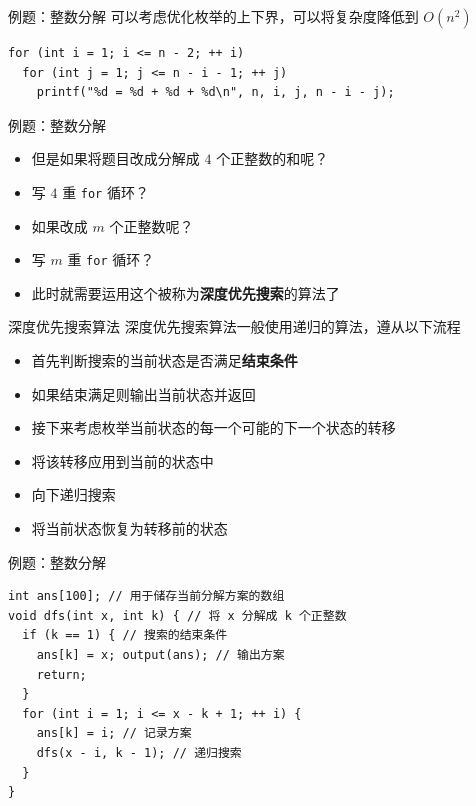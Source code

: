 \documentclass[12pt,aspectratio=169]{beamer}
\begin{document}
\begin{frame}[fragile]{例题：整数分解}
  可以考虑优化枚举的上下界，可以将复杂度降低到 $O(n^2)$
  \begin{verbatim}
for (int i = 1; i <= n - 2; ++ i)
  for (int j = 1; j <= n - i - 1; ++ j)
    printf("%d = %d + %d + %d\n", n, i, j, n - i - j);
  \end{verbatim}
\end{frame}

\begin{frame}[fragile]{例题：整数分解}
  \begin{itemize}
    \item 但是如果将题目改成分解成 $4$ 个正整数的和呢？\pause
    \item 写 $4$ 重 \verb|for| 循环？\pause
    \item 如果改成 $m$ 个正整数呢？\pause
    \item 写 $m$ 重 \verb|for| 循环？\pause
    \item 此时就需要运用这个被称为\textbf{深度优先搜索}的算法了
  \end{itemize}
\end{frame}

\begin{frame}[fragile]{深度优先搜索算法}
  深度优先搜索算法一般使用递归的算法，遵从以下流程
  \begin{itemize}
    \item 首先判断搜索的当前状态是否满足\textbf{结束条件}
    \item 如果结束满足则输出当前状态并返回
    \item 接下来考虑枚举当前状态的每一个可能的下一个状态的转移
    \item 将该转移应用到当前的状态中
    \item 向下递归搜索
    \item 将当前状态恢复为转移前的状态
  \end{itemize}
\end{frame}

\begin{frame}[fragile]{例题：整数分解}
  \begin{verbatim}
int ans[100]; // 用于储存当前分解方案的数组
void dfs(int x, int k) { // 将 x 分解成 k 个正整数
  if (k == 1) { // 搜索的结束条件
    ans[k] = x; output(ans); // 输出方案
    return;
  }
  for (int i = 1; i <= x - k + 1; ++ i) {
    ans[k] = i; // 记录方案
    dfs(x - i, k - 1); // 递归搜索
  }
}
  \end{verbatim}
\end{frame}
\end{document}
